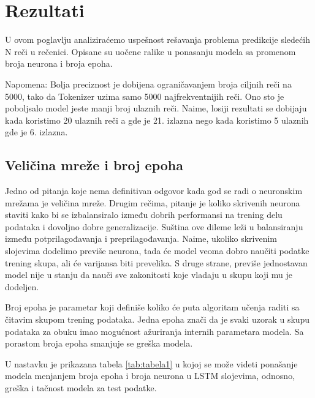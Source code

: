 \documentclass[a4paper]{article}
\begin{document}
\section{Rezultati}

U ovom poglavlju analiziraćemo uspešnost rešavanja problema predikcije sledećih N reči u rečenici. Opisane su uočene ralike u ponasanju modela sa promenom broja neurona i broja epoha. 

Napomena: Bolja preciznost je dobijena ograničavanjem broja ciljnih reči na 5000, tako da Tokenizer uzima samo 5000 najfrekventnijih reči.
Ono sto je poboljsalo model jeste manji broj ulaznih reči. Naime, losiji rezultati se dobijaju kada koristimo 20 ulaznih reči a gde je 21. izlazna nego kada koristimo 5 ulaznih gde je 6. izlazna.

\subsection{Veličina mreže i broj epoha}

Jedno od pitanja koje nema definitivan odgovor kada god se radi o neuronskim mrežama je veličina mreže. Drugim rečima, pitanje je koliko skrivenih neurona staviti kako bi se izbalansiralo između dobrih performansi na trening delu podataka i dovoljno dobre generalizacije. Suština ove dileme leži u balansiranju između potprilagođavanja i preprilagođavanja. Naime, ukoliko skrivenim slojevima dodelimo previše neurona, tada će model veoma dobro naučiti podatke trening skupa, ali će varijansa biti prevelika. S druge strane, previše jednostavan model nije u stanju da nauči sve zakonitosti koje vladaju u skupu koji mu je dodeljen.

Broj epoha je parametar koji definiše koliko će puta algoritam učenja raditi sa čitavim skupom trening podataka. Jedna epoha znači da je svaki uzorak u skupu podataka za obuku imao mogućnost ažuriranja internih parametara modela. Sa porastom broja epoha smanjuje se greška modela. 

 U nastavku je prikazana tabela \ref{tab:tabela1} u kojoj se može videti ponašanje modela menjanjem broja epoha i broja neurona u LSTM slojevima, odnosno, greška i tačnost modela za test podatke.
\end{document}
